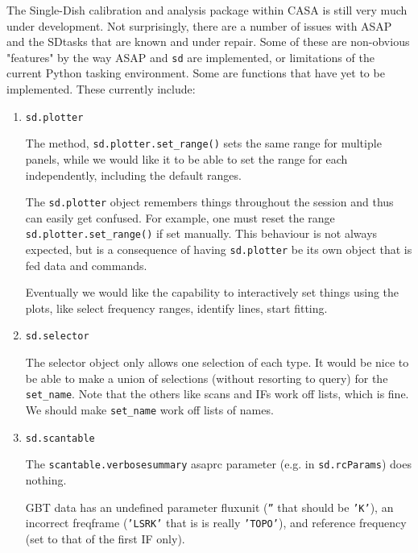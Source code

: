 The Single-Dish calibration and analysis package within CASA is still
very much under development.  Not surprisingly,
there are a number of issues with ASAP and the SDtasks that are known and
under repair.  Some of these are non-obvious "features" by the way
ASAP and {\tt sd} are implemented, or limitations of the current Python
tasking environment.  Some are functions that have yet to be
implemented.  These currently include: 

\begin{enumerate}

\item {\tt sd.plotter}

  The method, {\tt sd.plotter.set\_range()} sets the same range for
  multiple panels, while we would like it to be able to set the
  range for each independently, including the default ranges.

  The {\tt sd.plotter} object remembers things throughout the session and
  thus can easily get confused. For example, one must reset the
  range {\tt sd.plotter.set\_range()} if set manually. This behaviour is
  not always expected, but is a consequence of having {\tt sd.plotter} be
  its own object that is fed data and commands.

  Eventually we would like the capability to interactively
  set things using the plots, like select frequency ranges,
  identify lines, start fitting. 

\item {\tt sd.selector}

  The selector object only allows one selection of each type.  It would be 
  nice to be able to make a union of selections (without resorting to query)
  for the {\tt set\_name}.  Note that the others like scans and IFs work off
  lists, which is fine.  We should make {\tt set\_name} work off lists of names.

\item {\tt sd.scantable}

  The {\tt scantable.verbosesummary}
  asaprc parameter (e.g. in {\tt sd.rcParams}) does nothing.

  GBT data has an undefined parameter fluxunit ({\tt ''} that should be {\tt 'K'}), an 
  incorrect freqframe ({\tt 'LSRK'} that is is really {\tt 'TOPO'}), and reference
  frequency (set to that of the first IF only).


\end{enumerate}
